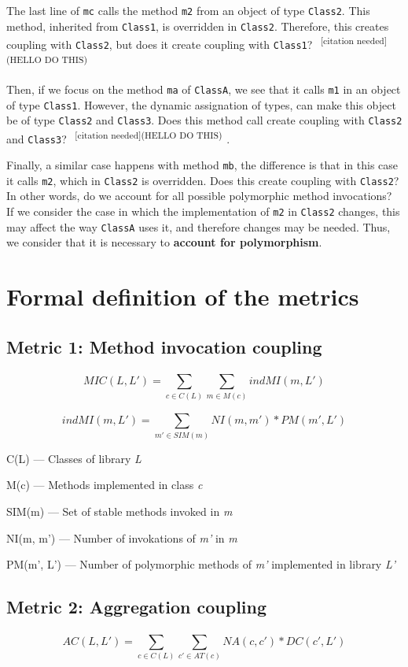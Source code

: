 \documentclass[a4paper]{article}
\newcommand{\cn}[1]{\textsuperscript{\color{red} ~[citation needed](#1)~}}
\begin{document}
The last line of \texttt{mc} calls the method \texttt{m2} from an object of type \texttt{Class2}. This method, inherited from \texttt{Class1}, is overridden in \texttt{Class2}. Therefore, this creates coupling with \texttt{Class2}, but does it create coupling with \texttt{Class1}? \cn{HELLO DO THIS}

Then, if we focus on the method \texttt{ma} of \texttt{ClassA}, we see that it calls \texttt{m1} in an object of type \texttt{Class1}. However, the dynamic assignation of types, can make this object be of type \texttt{Class2} and \texttt{Class3}. Does this method call create coupling with \texttt{Class2} and \texttt{Class3}? \cn{HELLO DO THIS}.

Finally, a similar case happens with method \texttt{mb}, the difference is that in this case it calls \texttt{m2}, which in \texttt{Class2} is overridden. Does this create coupling with \texttt{Class2}? In other words, do we account for all possible polymorphic method invocations? If we consider the case in which the implementation of \texttt{m2} in \texttt{Class2} changes, this may affect the way \texttt{ClassA} uses it, and therefore changes may be needed. Thus, we consider that it is necessary to \textbf{account for polymorphism}.

\section{Formal definition of the metrics}

\subsection{Metric 1: Method invocation coupling}
\[
  MIC(L, L') = \sum_{c \in C(L)}^{} \sum_{m \in M(c)}^{} indMI(m, L')
\]

\[
  indMI(m, L') = \sum_{m' \in SIM(m)}^{} NI(m, m')*PM(m', L')
\]

C(L) --- Classes of library \textit{L}

M(c) --- Methods implemented in class \textit{c}

SIM(m) --- Set of stable methods invoked in \textit{m}

NI(m, m') --- Number of invokations of \textit{m'} in \textit{m}

PM(m', L') --- Number of polymorphic methods of \textit{m'} implemented in library \textit{L'}

\subsection{Metric 2: Aggregation coupling}
\[
  AC(L,L') = \sum_{c \in C(L)}^{} \sum_{c' \in AT(c)}^{} NA(c, c')*DC(c', L')
\]
\end{document}
